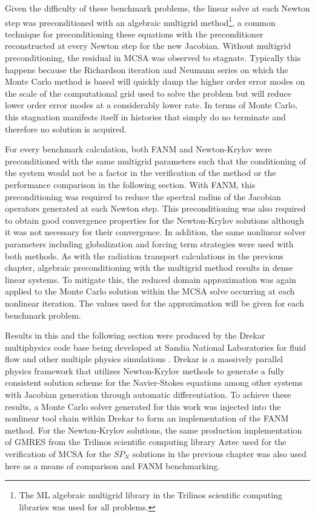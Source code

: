 Given the difficulty of these benchmark problems, the linear solve at
each Newton step was preconditioned with an algebraic multigrid
method\footnote{The ML algebraic multigrid library in the Trilinos
  scientific computing libraries \cite{heroux_overview_2005} was used
  for all problems.}, a common technique for preconditioning these
equations \cite{ghia_high-re_1982,evans_enhanced_2007} with the
preconditioner reconstructed at every Newton step for the new
Jacobian. Without multigrid preconditioning, the residual in MCSA was
observed to stagnate. Typically this happens because the Richardson
iteration and Neumann series on which the Monte Carlo method is based
will quickly damp the higher order error modes on the scale of the
computational grid used to solve the problem but will reduce lower
order error modes at a considerably lower rate. In terms of Monte
Carlo, this stagnation manifests itself in histories that simply do no
terminate and therefore no solution is acquired.

For every benchmark calculation, both FANM and Newton-Krylov were
preconditioned with the same multigrid parameters such that the
conditioning of the system would not be a factor in the verification
of the method or the performance comparison in the following
section. With FANM, this preconditioning was required to reduce the
spectral radius of the Jacobian operators generated at each Newton
step. This preconditioning was also required to obtain good
convergence properties for the Newton-Krylov solutions although it was
not necessary for their convergence. In addition, the same nonlinear
solver parameters including globalization and forcing term strategies
were used with both methods. As with the radiation transport
calculations in the previous chapter, algebraic preconditioning with
the multigrid method results in dense linear systems. To mitigate
this, the reduced domain approximation was again applied to the Monte
Carlo solution within the MCSA solve occurring at each nonlinear
iteration. The values used for the approximation will be given for
each benchmark problem.

Results in this and the following section were produced by the Drekar
multiphysics code base being developed at Sandia National Laboratories
for fluid flow and other multiple physics simulations
\cite{pawlowski_drekar_2012}. Drekar is a massively parallel physics
framework that utilizes Newton-Krylov methods to generate a fully
consistent solution scheme for the Navier-Stokes equations among other
systems with Jacobian generation through automatic differentiation. To
achieve these results, a Monte Carlo solver generated for this work
was injected into the nonlinear tool chain within Drekar to form an
implementation of the FANM method. For the Newton-Krylov solutions,
the same production implementation of GMRES from the Trilinos
scientific computing library Aztec \cite{heroux_overview_2005} used
for the verification of MCSA for the $SP_N$ solutions in the previous
chapter was also used here as a means of comparison and FANM
benchmarking.

